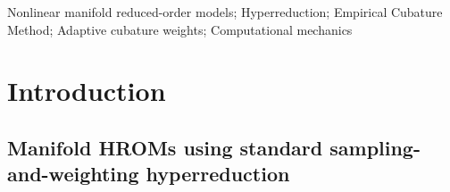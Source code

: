 \documentclass[preprint,10pt]{elsarticle}  %
\newcommand{\PROMPT}[1]{ }
\begin{document}
\begin{frontmatter}
\begin{keyword}
Nonlinear manifold reduced-order models; Hyperreduction; Empirical Cubature Method; Adaptive cubature weights;  Computational mechanics
\end{keyword}

\end{frontmatter}










\section{Introduction}

%
%
%
%
%

%
%
%

\subsection{Manifold HROMs using standard sampling-and-weighting hyperreduction}
\end{document}
